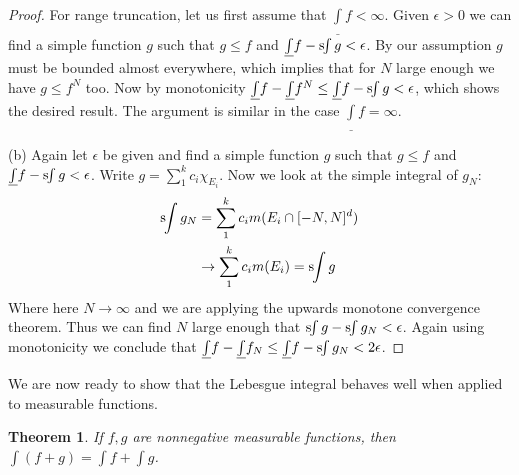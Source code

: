 \documentclass[11pt,oneside]{amsbook}
\newcommand{\sint}{\text{s}\kern-3pt\int}
\newcommand{\lint}{\underline\int}
\theoremstyle{definition}
\theoremstyle{plain}
\newtheorem{thm}{Theorem}[section]
\theoremstyle{definition}
\theoremstyle{remark}
\numberwithin{equation}{section}
\numberwithin{figure}{section}
\begin{document}
\begin{proof}
  For range truncation, let us first assume that $\lint f<\infty$. Given $\epsilon>0$ we can find a simple function $g$ such that $g\leq f$ and $\lint f-\sint g<\epsilon$. By our assumption $g$ must be bounded almost everywhere, which implies that for $N$ large enough we have $g\leq f^N$ too. Now by monotonicity $\lint f-\lint f^N\leq \lint f-\sint g<\epsilon$, which shows the desired result. The argument is similar in the case $\lint f=\infty$.

  (b) Again let $\epsilon$ be given and find a simple function $g$ such that $g\leq f$ and $\lint f-\sint g<\epsilon$. Write $g=\sum_1^kc_i\chi_{E_i}$. Now we look at the simple integral of $g_N$:
  \begin{align*}
    \sint g_N&=\sum_1^kc_im(E_i\cap[-N,N]^d)\\
                    &\to\sum_1^kc_im(E_i)=\sint g
  \end{align*}
  Where here $N\to\infty$ and we are applying the upwards monotone convergence theorem. Thus we can find $N$ large enough that $\sint g-\sint g_N<\epsilon$. Again using monotonicity we conclude that $\lint f-\lint f_N\leq\lint f-\sint g_N<2\epsilon$.
\end{proof}

We are now ready to show that the Lebesgue integral behaves well when applied to measurable functions.

\begin{thm}
  If $f,g$ are nonnegative measurable functions, then $\int(f+g)=\int f+\int g$.
\end{thm}
\end{document}
